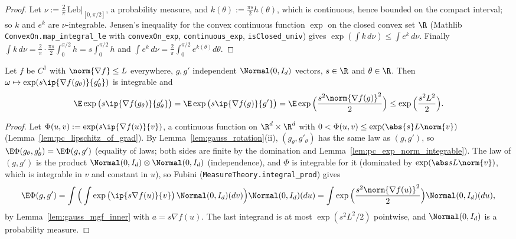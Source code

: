 \begin{proof}
\leanok
Let $\nu := \frac2\pi\,\mathrm{Leb}|_{[0,\pi/2]}$, a probability measure, and
$k(\theta) := \frac{\pi s}{2}h(\theta)$, which is continuous, hence bounded on the compact
interval; so $k$ and $e^{k}$ are $\nu$-integrable. Jensen's inequality for the convex
continuous function $\exp$ on the closed convex set $\R$ (Mathlib
\texttt{ConvexOn.map\_integral\_le} with \texttt{convexOn\_exp}, \texttt{continuous\_exp},
\texttt{isClosed\_univ}) gives $\exp(\int k\,d\nu) \le \int e^{k}\,d\nu$. Finally
$\int k\,d\nu = \frac2\pi\cdot\frac{\pi s}{2}\int_0^{\pi/2}h = s\int_0^{\pi/2}h$ and
$\int e^k\,d\nu = \frac2\pi\int_0^{\pi/2}e^{k(\theta)}d\theta$.
\end{proof}

\begin{lemma}\label{lem:pc_rotated_mgf_bound}
\leanok
{}
Let $f$ be $C^1$ with $\norm{\nabla f} \le L$ everywhere, $g, g'$ independent
$\Normal(0,I_d)$ vectors, $s \in \R$ and $\theta \in \R$. Then
$\omega \mapsto \exp(s\ip{\nabla f(g_\theta)}{g'_\theta})$ is integrable and
\[
  \E\exp\big(s\ip{\nabla f(g_\theta)}{g'_\theta}\big)
  = \E\exp\big(s\ip{\nabla f(g)}{g'}\big)
  = \E\exp\Big(\frac{s^2\norm{\nabla f(g)}^2}{2}\Big) \le \exp\Big(\frac{s^2L^2}{2}\Big).
\]
\end{lemma}

\begin{proof}
\leanok
{}
Let $\Phi(u,v) := \exp(s\ip{\nabla f(u)}{v})$, a continuous function on $\R^d\times\R^d$ with
$0 < \Phi(u,v) \le \exp(\abs{s}L\norm{v})$ (Lemma~\ref{lem:pc_lipschitz_of_grad}). By
Lemma~\ref{lem:gauss_rotation}(ii), $(g_\theta, g'_\theta)$ has the same law as $(g,g')$, so
$\E\Phi(g_\theta,g'_\theta) = \E\Phi(g,g')$ (equality of laws; both sides are finite by the
domination and Lemma~\ref{lem:pc_exp_norm_integrable}). The law of $(g,g')$ is the product
$\Normal(0,I_d)\otimes\Normal(0,I_d)$ (independence), and $\Phi$ is integrable for it (dominated
by $\exp(\abs sL\norm{v})$, which is integrable in $v$ and constant in $u$), so Fubini
(\texttt{MeasureTheory.integral\_prod}) gives
\[
  \E\Phi(g,g') = \int\Big(\int\exp\big(\ip{s\nabla f(u)}{v}\big)\,\Normal(0,I_d)(dv)\Big)\Normal(0,I_d)(du)
  = \int\exp\Big(\frac{s^2\norm{\nabla f(u)}^2}{2}\Big)\Normal(0,I_d)(du),
\]
by Lemma~\ref{lem:gauss_mgf_inner} with $a = s\nabla f(u)$. The last integrand is at most
$\exp(s^2L^2/2)$ pointwise, and $\Normal(0,I_d)$ is a probability measure.
\end{proof}

